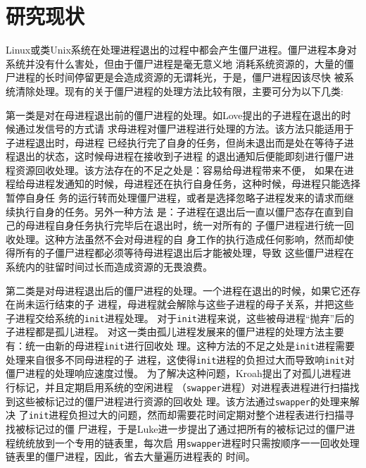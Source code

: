 \documentclass{swfuthesism}
\begin{document}
\section{研究现状}


Linux或类Unix系统在处理进程退出的过程中都会产生僵尸进程。僵尸进程本身对系统并没有什么害处，但由于僵尸进程是毫无意义地
消耗系统资源的，大量的僵尸进程的长时间停留更是会造成资源的无谓耗光，于是，僵尸进程因该尽快
被系统清除处理。现有的关于僵尸进程的处理方法比较有限，主要可分为以下几类:

第一类是对在母进程退出前的僵尸进程的处理。如Love提出的子进程在退出的时候通过发信号的方式请
求母进程对僵尸进程进行处理的方法\cite{love2010linux}。该方法只能适用于子进程退出时，母进程
已经执行完了自身的任务，但尚未退出而是处在等待子进程退出的状态，这时候母进程在接收到子进程
的退出通知后便能即刻进行僵尸进程资源回收处理。该方法存在的不足之处是：容易给母进程带来不便，
如果在进程给母进程发通知的时候，母进程还在执行自身任务，这种时候，母进程只能选择暂停自身任
务的运行转而处理僵尸进程，或者是选择忽略子进程发来的请求而继续执行自身的任务。另外一种方法
是：子进程在退出后一直以僵尸态存在直到自己的母进程自身任务执行完毕后在退出时，统一对所有的
子僵尸进程进行统一回收处理\cite{william_eric_harshadrai_2006}。这种方法虽然不会对母进程的自
身工作的执行造成任何影响，然而却使得所有的子僵尸进程都必须等待母进程退出后才能被处理，导致
这些僵尸进程在系统内的驻留时间过长而造成资源的无畏浪费。

第二类是对母进程退出后的僵尸进程的处理。一个进程在退出的时候，如果它还存在尚未运行结束的子
进程，母进程就会解除与这些子进程的母子关系，并把这些子进程交给系统的\texttt{init}进程处理。
对于\texttt{init}进程来说，这些被母进程“抛弃”后的子进程都是孤儿进程\cite{bach1986design}。
对这一类由孤儿进程发展来的僵尸进程的处理方法主要有：统一由新的母进程\texttt{init}进行回收处
理\cite{zombie-orphan}。这种方法的不足之处是\texttt{init}进程需要处理来自很多不同母进程的子
进程，这使得\texttt{init}进程的负担过大而导致响\texttt{init}对僵尸进程的处理响应速度过慢。
为了解决这种问题，Kroah提出了对孤儿进程进行标记，并且定期启用系统的空闲进程
（\texttt{swapper}进程）对进程表进程进行扫描找到这些被标记过的僵尸进程进行资源的回收处
理\cite{zombie-orphancause,Kroah-Hartman:1053063}。该方法通过\texttt{swapper}的处理来解决
了\texttt{init}进程负担过大的问题，然而却需要花时间定期对整个进程表进行扫描寻找被标记过的僵
尸进程，于是Luke进一步提出了通过把所有的被标记过的僵尸进程统统放到一个专用的链表里，每次启
用\texttt{swapper}进程时只需按顺序一一回收处理链表里的僵尸进程，因此，省去大量遍历进程表的
时间\cite{zombie-swapper}。
\end{document}
